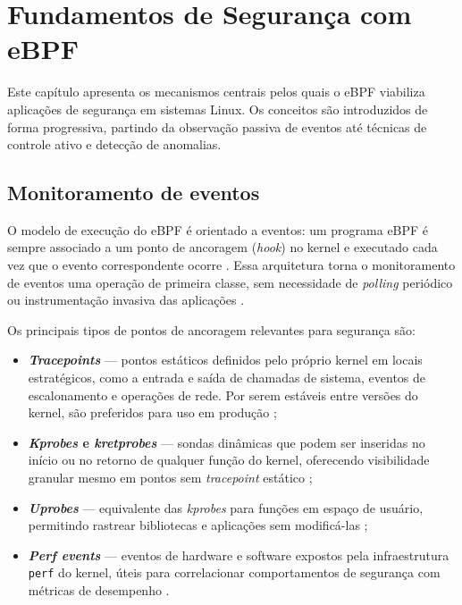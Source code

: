 \chapter{Fundamentos de Segurança com eBPF}

Este capítulo apresenta os mecanismos centrais pelos quais o eBPF viabiliza
aplicações de segurança em sistemas Linux.
Os conceitos são introduzidos de forma progressiva, partindo da observação passiva
de eventos até técnicas de controle ativo e detecção de anomalias.

\section{Monitoramento de eventos}

O modelo de execução do eBPF é orientado a eventos: um programa eBPF é sempre
associado a um ponto de ancoragem (\textit{hook}) no kernel e executado cada vez
que o evento correspondente ocorre \cite{linuxkernel2024}.
Essa arquitetura torna o monitoramento de eventos uma operação de primeira classe,
sem necessidade de \textit{polling} periódico ou instrumentação invasiva das
aplicações \cite{cassagnes2020}.

Os principais tipos de pontos de ancoragem relevantes para segurança são:

\begin{itemize}
  \item \textbf{\textit{Tracepoints}} — pontos estáticos definidos pelo próprio
        kernel em locais estratégicos, como a entrada e saída de chamadas de sistema,
        eventos de escalonamento e operações de rede.
        Por serem estáveis entre versões do kernel, são preferidos para uso em
        produção \cite{gregg2019};

  \item \textbf{\textit{Kprobes} e \textit{kretprobes}} — sondas dinâmicas que
        podem ser inseridas no início ou no retorno de qualquer função do kernel,
        oferecendo visibilidade granular mesmo em pontos sem \textit{tracepoint}
        estático \cite{gregg2020};

  \item \textbf{\textit{Uprobes}} — equivalente das \textit{kprobes} para funções
        em espaço de usuário, permitindo rastrear bibliotecas e aplicações sem
        modificá-las \cite{bpftrace};

  \item \textbf{\textit{Perf events}} — eventos de hardware e software expostos
        pela infraestrutura \texttt{perf} do kernel, úteis para correlacionar
        comportamentos de segurança com métricas de desempenho
        \cite{gregg2019}.
\end{itemize}

